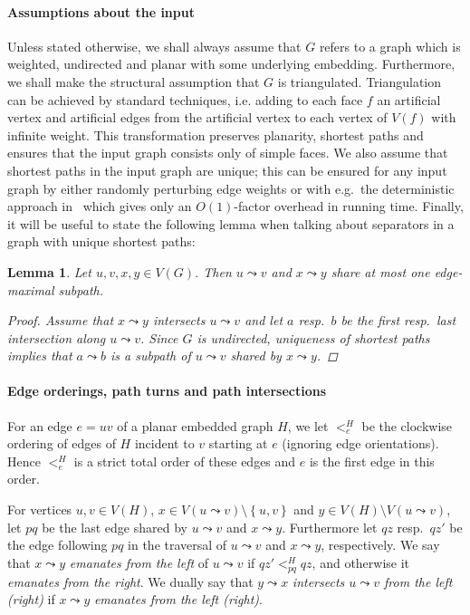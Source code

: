 \documentclass[a4paper,UKenglish,cleveref, autoref, thm-restate]{article}
\newtheorem{lemma}{Lemma}
\begin{document}
\paragraph*{Assumptions about the input} Unless stated otherwise, we shall always assume that $G$ refers to a graph which is weighted, undirected and planar with some underlying embedding. Furthermore, we shall make the structural assumption that $G$ is triangulated. Triangulation can be achieved by standard techniques, i.e. adding to each face $f$ an artificial vertex and artificial edges from the artificial vertex to each vertex of $V(f)$ with infinite weight. This transformation preserves planarity, shortest paths and ensures that the input graph consists only of simple faces. We also assume that shortest paths in the input graph are unique; this can be ensured for any input graph by either randomly perturbing edge weights or with e.g.~the deterministic approach in~\cite{UniqueShortestPaths} which gives only an $O(1)$-factor overhead in running time. Finally, it will be useful to state the following lemma when talking about separators in a graph with unique shortest paths: 

\begin{lemma}
Let $u,v,x,y \in V(G)$. Then $u \leadsto v$ and $x \leadsto y$ share at most one edge-maximal subpath. \label{lem:sp-join-leave-once}
\begin{proof}
Assume that $x\leadsto y$ intersects $u\leadsto v$ and let $a$ resp.~$b$ be the first resp.~last intersection along $u\leadsto v$. Since $G$ is undirected, uniqueness of shortest paths implies that $a\leadsto b$ is a subpath of $u\leadsto v$ shared by $x\leadsto y$.
\end{proof}
\end{lemma}

\paragraph*{Edge orderings, path turns and path intersections}
For an edge $e = uv$ of a planar embedded graph $H$, we let $<_{e}^{H}$ be the clockwise ordering of edges of $H$ incident to $v$ starting at $e$ (ignoring edge orientations). Hence $<_{e}^{H}$ is a strict total order of these edges and $e$ is the first edge in this order.

For vertices $u,v \in V(H)$, $x \in V(u \leadsto v) \setminus \left\{ u,v \right\}$ and $y \in V(H) \setminus V(u \leadsto v)$, let $pq$ be the last edge shared by $u \leadsto v$ and $x \leadsto y$. Furthermore let $qz$ resp.~$qz'$ be the edge following $pq$ in the traversal of $u \leadsto v$ and $x \leadsto y$, respectively. We say that $x \leadsto y$ \textit{emanates from the left} of $u \leadsto v$ if $qz' <_{pq}^H qz$, and otherwise it \textit{emanates from the right}. We dually say that $y \leadsto x$ \textit{intersects $u \leadsto v$ from the left (right)} if $x \leadsto y$ \textit{emanates from the left (right)}.
\end{document}
